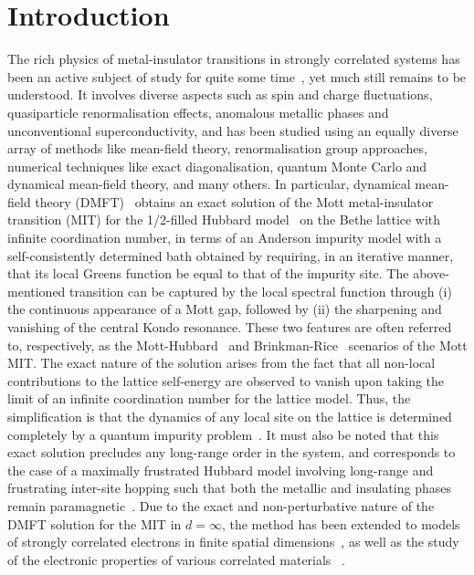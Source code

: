 \documentclass{iopart}
\begin{document}
\section{Introduction}

The rich physics of metal-insulator transitions in strongly correlated systems has been an active subject of study for quite some time~\cite{Mott_RMP_1968,milligan_1985,imada1998metal}, yet much still remains to be understood. It involves diverse aspects such as spin and charge fluctuations, quasiparticle renormalisation effects, anomalous metallic phases and unconventional superconductivity, and has been studied using an equally diverse array of methods like mean-field theory, renormalisation group approaches, numerical techniques like exact diagonalisation, quantum Monte Carlo and dynamical mean-field theory, and many others. In particular, dynamical mean-field theory (DMFT)~\cite{kuramoto1987,Cox1988,metzner_volhardt_1989,zhang_1993,georges1996,parcollet_2004,maier_2005,kotliar_2006,ohashi_2008} obtains an exact solution of the Mott metal-insulator transition (MIT) for the 1/2-filled Hubbard model~\cite{Mott_1949,gutzwiller_1963,kanamori_1963,hubbard1963electron,brinkman_rice_1970} on the Bethe lattice with infinite coordination number, in terms of an Anderson impurity model with a self-consistently determined bath obtained by requiring, in an iterative manner, that its local Greens function be equal to that of the impurity site. The above-mentioned transition can be captured by the local spectral function through (i) the continuous appearance of a Mott gap, followed by (ii) the sharpening and vanishing of the central Kondo resonance. These two features are often referred to, respectively, as the Mott-Hubbard~\cite{hubbard1963electron} and Brinkman-Rice~\cite{brinkman_rice_1970} scenarios of the Mott MIT. The exact nature of the solution arises from the fact that all non-local contributions to the lattice self-energy are observed to vanish upon taking the limit of an infinite coordination number for the lattice model. 
Thus, the simplification is that the dynamics of any local site on the lattice is determined completely by a quantum impurity problem~\cite{georges1996,Logan_2015}.
It must also be noted that this exact solution precludes any long-range order in the system, and corresponds to the case of a maximally frustrated Hubbard model involving long-range and frustrating inter-site hopping such that both the metallic and insulating phases remain paramagnetic~\cite{vucicevic_2013}.
Due to the exact and non-perturbative nature of the DMFT solution for the MIT in \(d=\infty\), the method has been extended to models of strongly correlated electrons in finite spatial dimensions~\cite{park2008,rohringer_2018,maier_2005}, as well as the study of the electronic properties of various correlated materials ~\cite{lichenstein_1998,kotliar_2006,held_2007_ldadmft}.
\end{document}
